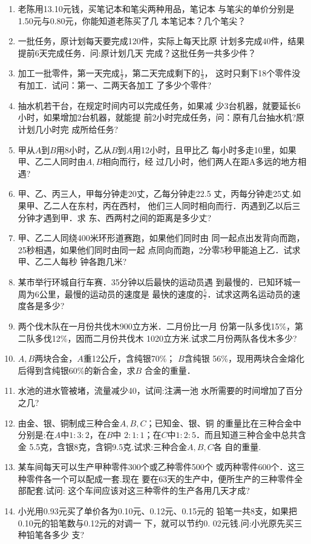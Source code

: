 \begin{enumerate}
\item  老陈用13.10元钱，买笔记本和笔尖两种用品，笔记本
与笔尖的单价分别是1.50元与0.80元，你能知道老陈买了几
本笔记本？几个笔尖？
\item  一批任务，原计划每天要完成120件，实际上每天比原
计划多完成40件，结果提前6天完成任务．问:原计划几天
完成？这批任务一共多少件？
\item  加工一批零件，第一天完成$\frac{1}{2}$，第二天完成剩下的$\frac{1}{3}$，
这时只剩下18个零件没有加工．试问：第一、二两天各加工
了多少个零件?
\item  抽水机若干台，在规定时间内可以完成任务，如果减
少3台机器，就要延长6小时，如果增加2台机器，就能提
前2小时完成任务，问：原有几台抽水机?原计划几小时完
成所给任务?
\item  甲从$A$到$B$用8小时，乙从$B$到$A$用12小时，且甲比乙
每小时多走10里，如果甲、乙二人同时由$A, B$相向而行，经
过几小时，他们两人在距A多远的地方相遇?
\item  甲、乙、丙三人，甲每分钟走20丈，乙每分钟走22.5
丈，丙每分钟走25丈.如果甲、乙二人在东村，丙在西村，
他们三人同时相向而行．丙遇到乙以后三分钟才遇到甲．求
东、西两村之间的距离是多少丈?
\item  甲、乙二人同绕400米环形道赛跑，如果他们同时由
同一起点出发背向而跑，25秒相遇，如果他们同时由同一起
点同向而跑，2分零5秒甲能追上乙．试求甲、乙二人每秒
钟各跑几米?
\item  某市举行环城自行车赛．35分钟以后最快的运动员遇
到最慢的．已知环城一周为6公里，最慢的运动员的速度是
最快的速度的$\frac{5}{7}$．试求这两名运动员的速度各是多少?
\item  两个伐木队在一月份共伐木900立方米．二月份比一月
份第一队多伐15\%，第二队多伐12\%，因而二月份共伐木
1020立方米.试求二月份两队各伐木多少?
\item $A, B$两块合金，$A$重12公斤，含纯银70\%； $B$含纯银
56\%，现用两块合金熔化后得到含纯银60\%的新合金，求$B$
合金的重量．
\item 水池的进水管被堵，流量减少40，试间:注满一池
水所需要的时间增加了百分之几?
\item 由金、银、铜制成三种合金$A, B,C$；已知金、银、铜
的重量比在三种合金中分别是:在$A$中$1:3:2$，在$B$中
$2:1:1$；在$C$中$1:2:5$．而且知道三种合金中总共含金
5.5克，含银8克，含铜9.5克.试求:三种合金$A, B,C$各
自的重量.
\item 某车间每天可以生产甲种零件300个或乙种零件500个
或丙种零件600个．这三种零件各一个可以配成一套.现在
要在63天的生产中，便所生产的三种零件全部配套.试问:
这个车间应该对这三种零件的生产各用几天才成?
\item 小光用0.93元买了单价各为0.10元、0.12元、0.15元的
铅笔一共8支，如果把0.10元的铅笔数与0.12元的对调一
下，就可以节约0. 02元钱.问:小光原先买三种铅笔各多少
支?


\end{enumerate}
